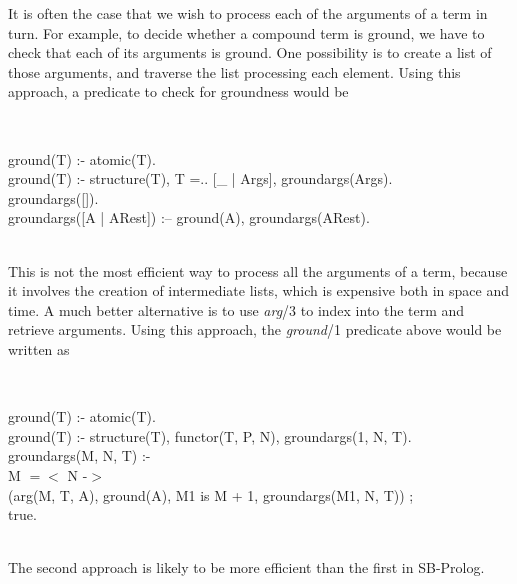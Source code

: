 It is often the case that we wish to process each of the arguments of a
term in turn.
For example, to decide whether a compound term is ground,
we have to check that each of its arguments is ground.
One possibility is to create a list of those arguments,
and traverse the list processing each element.
Using this approach, a predicate to check for groundness would be \\
\begin{minipage}{\textwidth} \tt\centering
\begin{tabbing}
ground(T) :- atomic(T). \\
ground(T) :- structure(T), T =.. [\_ | Args], groundargs(Args). \\
groundargs([]). \\
groundargs([A | ARest]) :-- ground(A), groundargs(ARest).
\end{tabbing}
\end{minipage} \\
This is not the most efficient way to process all the arguments of a term,
because it involves the creation of intermediate lists, which is expensive
both in space and time.
A much better alternative is to use {\em arg}/3
to index into the term and retrieve arguments.
Using this approach, the {\em ground}\//1 predicate above would be written as \\
\begin{minipage}{\textwidth} \tt\centering
\begin{tabbing}
ground(T) :- atomic(T). \\
ground(T) :- structure(T), functor(T, P, N), groundargs(1, N, T). \\
groundargs(M, N, T) :- \\
       M $=<$ N -$>$ \\
            (arg(M, T, A), ground(A), M1 is M + 1, groundargs(M1, N, T)) ; \\
            true.
\end{tabbing}
\end{minipage} \\
The second approach is likely to be more efficient than the first in SB-Prolog.

